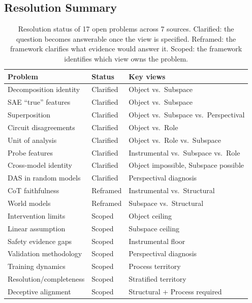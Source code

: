\documentclass{article}
\begin{document}
\subsection{Resolution Summary}

\begin{table}[H]
\centering
\footnotesize
\begin{tabular}{lll}
\toprule
\textbf{Problem} & \textbf{Status} & \textbf{Key views} \\
\midrule
Decomposition identity & Clarified & Object vs.\ Subspace \\
SAE ``true'' features & Clarified & Object vs.\ Subspace \\
Superposition & Clarified & Object vs.\ Subspace vs.\ Perspectival \\
Circuit disagreements & Clarified & Object vs.\ Role \\
Unit of analysis & Clarified & Object vs.\ Role vs.\ Subspace \\
Probe features & Clarified & Instrumental vs.\ Subspace vs.\ Role \\
Cross-model identity & Clarified & Object impossible, Subspace possible \\
DAS in random models & Clarified & Perspectival diagnosis \\
CoT faithfulness & Reframed & Instrumental vs.\ Structural \\
World models & Reframed & Subspace vs.\ Structural \\
Intervention limits & Scoped & Object ceiling \\
Linear assumption & Scoped & Subspace ceiling \\
Safety evidence gaps & Scoped & Instrumental floor \\
Validation methodology & Scoped & Perspectival diagnosis \\
Training dynamics & Scoped & Process territory \\
Resolution/completeness & Scoped & Stratified territory \\
Deceptive alignment & Scoped & Structural + Process required \\
\bottomrule
\end{tabular}
\caption{Resolution status of 17 open problems across 7 sources.
Clarified: the question becomes answerable once the view is specified. Reframed:
the framework clarifies what evidence would answer it. Scoped: the
framework identifies which view owns the problem.}
\label{tab:openprobs}
\end{table}
\end{document}

